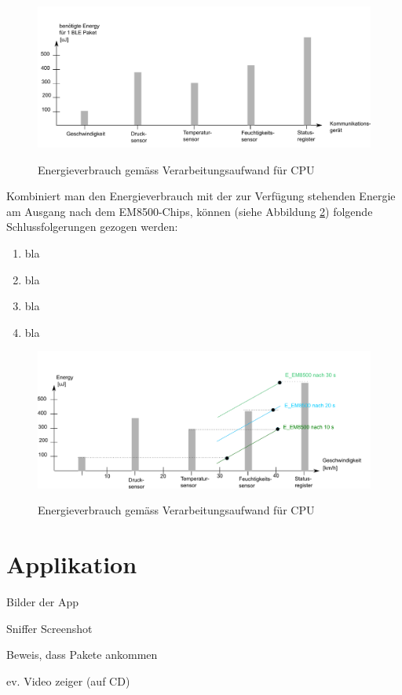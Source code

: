 \begin{figure}[ht]
\includegraphics[width=1\textwidth]{4Resultate/imag/EnergyVerbrauchNachKommunikation.png} \label{resultat_E_Verbrauch_Verarbeitungsaufwand} 
\caption{Energieverbrauch gemäss Verarbeitungsaufwand für CPU}
\end{figure}

Kombiniert man den Energieverbrauch mit der zur Verfügung stehenden Energie am Ausgang nach dem EM8500-Chips, können (siehe Abbildung \ref{resultat_Zsm_Energy}) folgende Schlussfolgerungen gezogen werden:

\begin{enumerate}
    \item bla
    \item bla
    \item bla
    \item bla
\end{enumerate}

\begin{figure}[ht]
\includegraphics[width=1\textwidth]{4Resultate/imag/EnergyVerbrauchZusammenfassung.png}\label{resultat_Zsm_Energy} 
\caption{Energieverbrauch gemäss Verarbeitungsaufwand für CPU}
\end{figure}


\section{Applikation}

Bilder der App

Sniffer Screenshot

Beweis, dass Pakete ankommen

ev. Video zeiger (auf CD)






